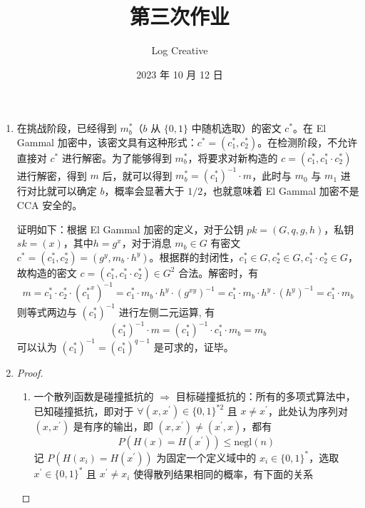 \documentclass{sjtuarticle}
\title{第三次作业}
\author{Log Creative}
\date{2023 年 10 月 12 日}
\begin{document}
\maketitle
\begin{enumerate}
    \item \begin{solution}
        在挑战阶段，已经得到 $m_b^*$（$b$ 从 $\{0,1\}$ 中随机选取）的密文 $c^*$。在 El Gammal 加密中，该密文具有这种形式：$c^*=(c_1^*,c_2^*)$。在检测阶段，不允许直接对 $c^*$ 进行解密。为了能够得到 $m_b^*$，将要求对新构造的 $c=(c_1^*,c_1^*\cdot c_2^*)$ 进行解密，得到 $m$ 后，就可以得到 $m_b^*=(c_1^*)^{-1}\cdot m$，此时与 $m_0$ 与 $m_1$ 进行对比就可以确定 $b$，概率会显著大于 $1/2$，也就意味着 El Gammal 加密不是 CCA 安全的。

        证明如下：根据 El Gammal 加密的定义，对于公钥 $\mathit{pk}=(G,q,g,h)$，私钥 $\mathit{sk}=(x)$，其中$h=g^x$，对于消息 $m_b\in G$ 有密文 $c^*=(c_1^*,c_2^*)=(g^y,m_b\cdot h^y)$。根据群的封闭性，$c_1^*\in G,c_2^*\in G, c_1^*\cdot c_2^*\in G$，故构造的密文 $c=(c_1^*,c_1^*\cdot c_2^*)\in G^2$ 合法。解密时，有
        \begin{equation*}
            m = c_1^* \cdot c_2^*\cdot ({c_1^*}^x)^{-1}=c_1^*\cdot m_b\cdot h^y\cdot (g^{xy})^{-1} = c_1^* \cdot m_b\cdot h^y\cdot (h^y)^{-1}=c_1^*\cdot m_b
        \end{equation*}
        则等式两边与 $(c_1^*)^{-1}$ 进行左侧二元运算, 有
        \begin{equation*}
            (c_1^*)^{-1}\cdot m = (c_1^*)^{-1}\cdot c_1^*\cdot m_b = m_b
        \end{equation*}
        可以认为 $(c_1^*)^{-1}=(c_1^*)^{q-1}$ 是可求的，证毕。
    \end{solution}
    \item \begin{proof}
        \begin{enumerate}
            \item 一个散列函数是碰撞抵抗的 $\Rightarrow$ 目标碰撞抵抗的：所有的多项式算法中，已知碰撞抵抗，即对于 $\forall (x,x^\prime)\in \{0,1\}^{*2}$ 且 $x\neq x^\prime$，此处认为序列对 $(x,x^\prime)$ 是有序的输出，即 $(x,x^\prime)\neq (x^\prime,x)$，都有
            \begin{equation}\label{eq:cr}
                P\left(H(x)=H(x^\prime)\right)\leq \text{negl}(n)
            \end{equation}
            记 $P(H(x_i)=H(x^\prime))$ 为固定一个定义域中的 $x_i\in \{0,1\}^*$，选取 $x^\prime\in \{0,1\}^*$ 且 $x^\prime\neq x_i$ 使得散列结果相同的概率，有下面的关系

\end{enumerate}
\end{proof}
\end{enumerate}
\end{document}
